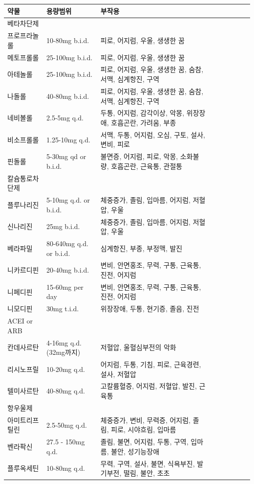 \documentclass[]{book}
\begin{document}
\begin{longtable}{lllllllll}
\toprule
약물 & 용량범위 & 부작용\\
\midrule
베타차단제 &  & \\
프로프라놀롤 & 10-80mg b.i.d. & 피로, 어지럼, 우울, 생생한 꿈\\
메토프롤롤 & 25-100mg b.i.d. & 피로, 어지럼, 우울, 생생한 꿈\\
아테놀롤 & 25-100mg b.i.d. & 피로, 어지럼, 우울, 생생한 꿈, 숨참, 서맥, 심계항진, 구역\\
나돌롤 & 40-80mg b.i.d. & 피로, 어지럼, 우울, 생생한 꿈, 숨참, 서맥, 심계항진, 구역\\
\addlinespace
네비볼롤 & 2.5-5mg q.d. & 두통, 어지럼, 감각이상, 악몽, 위장장애, 호흡곤란, 가려움, 부종\\
비소프롤롤 & 1.25-10mg q.d. & 서맥, 두통, 어지럼, 오심, 구토, 설사, 변비, 피로\\
핀돌롤 & 5-30mg qd or b.i.d. & 불면증, 어지럼, 피로, 악몽, 소화불량, 호흡곤란, 근육통, 관절통\\
칼슘통로차단제 &  & \\
플루나리진 & 5-10mg q.d. or b.i.d. & 체중증가, 졸림, 입마름, 어지럼, 저혈압, 우울\\
\addlinespace
신나리진 & 25mg b.i.d. & 체중증가, 졸림, 입마름, 어지럼, 저혈압, 우울\\
베라파밀 & 80-640mg q.d. or b.i.d. & 심계항진, 부종, 부정맥, 발진\\
니카르디핀 & 20-40mg b.i.d. & 변비, 안면홍조, 무력, 구통, 근육통, 진전, 어지럼\\
니페디핀 & 15-60mg per day & 변비, 안면홍조, 무력, 구통, 근육통, 진전, 어지럼\\
니모디핀 & 30mg t.i.d. & 위장장애, 두통, 현기증, 졸음, 진전\\
\addlinespace
ACEI or ARB &  & \\
칸데사르탄 & 4-16mg q.d.(32mg까지) & 저혈압, 울혈심부전의 악화\\
리시노프릴 & 10-20mg q.d. & 어지럼, 두통, 기침, 피로, 근육경련, 설사, 저혈압\\
텔미사르탄 & 40-80mg q.d. & 고칼륨혈증, 어지럼, 저혈압, 발진, 근육통\\
항우울제 &  & \\
\addlinespace
아미트리프틸린 & 2.5-50mg q.d. & 체중증가, 변비, 무력증, 어지럼, 졸림, 피로, 시야흐림, 입마름\\
벤라팍신 & 27.5 - 150mg q.d. & 졸림, 불면, 어지럼, 두통, 구역, 입마름, 불안, 성기능장애\\
플루옥세틴 & 10-80mg q.d. & 무력, 구역, 설사, 불면, 식욕부진, 발기부전, 떨림, 불안, 초초\\

\end{longtable}
\end{document}

